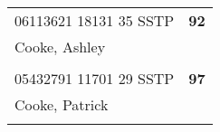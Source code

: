 \documentclass[a4paper,12pt]{article}
\begin{document}
\begin{tabular}{
   |p{9mm}|
    p{9mm}|
    p{9mm}|
    p{9mm}|
    p{9mm}|
    p{9mm}|
    p{9mm}|
    p{9mm}|
    p{9mm}|
    p{9mm}|}
      &    &    &    &    &    &    &    &    &     \\
\hline\hline
\multicolumn{9}{|l|}{06113621 18131 35 SSTP} & \textbf{92} \\
\hline
\multicolumn{10}{|l|}{Cooke, Ashley} \\
\hline
   \vrule height8mm width0pt depth2mm 
      &    &    &    &    &    &    &    &    &     \\
\hline\hline
\multicolumn{9}{|l|}{05432791 11701 29 SSTP} & \textbf{97} \\
\hline
\multicolumn{10}{|l|}{Cooke, Patrick} \\
\hline
   \vrule height8mm width0pt depth2mm 
      &    &    &    &    &    &    &    &    &     \\
\hline\hline
\end{tabular}
\newpage
\end{document}
